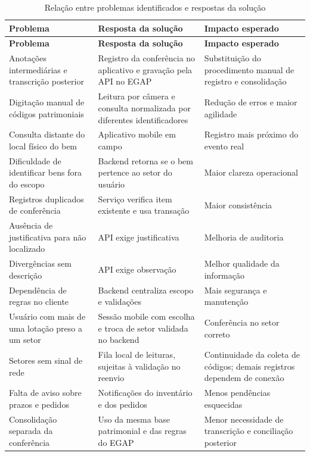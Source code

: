 \documentclass[12pt,a4paper]{article}
\begin{document}
\begin{longtable}{L{4.2cm}L{4.2cm}L{4.7cm}}
\caption{Relação entre problemas identificados e respostas da solução} \\
\toprule
\textbf{Problema} & \textbf{Resposta da solução} & \textbf{Impacto esperado} \\
\midrule
\endfirsthead
\toprule
\textbf{Problema} & \textbf{Resposta da solução} & \textbf{Impacto esperado} \\
\midrule
\endhead
Anotações intermediárias e transcrição posterior & Registro da conferência no aplicativo e gravação pela API no EGAP & Substituição do procedimento manual de registro e consolidação \\
Digitação manual de códigos patrimoniais & Leitura por câmera e consulta normalizada por diferentes identificadores & Redução de erros e maior agilidade \\
Consulta distante do local físico do bem & Aplicativo mobile em campo & Registro mais próximo do evento real \\
Dificuldade de identificar bens fora do escopo & Backend retorna se o bem pertence ao setor do usuário & Maior clareza operacional \\
Registros duplicados de conferência & Serviço verifica item existente e usa transação & Maior consistência \\
Ausência de justificativa para não localizado & API exige justificativa & Melhoria de auditoria \\
Divergências sem descrição & API exige observação & Melhor qualidade da informação \\
Dependência de regras no cliente & Backend centraliza escopo e validações & Mais segurança e manutenção \\
Usuário com mais de uma lotação preso a um setor & Sessão mobile com escolha e troca de setor validada no backend & Conferência no setor correto \\
Setores sem sinal de rede & Fila local de leituras, sujeitas à validação no reenvio & Continuidade da coleta de códigos; demais registros dependem de conexão \\
Falta de aviso sobre prazos e pedidos & Notificações do inventário e dos pedidos & Menos pendências esquecidas \\
Consolidação separada da conferência & Uso da mesma base patrimonial e das regras do EGAP & Menor necessidade de transcrição e conciliação posterior \\
\bottomrule
\end{longtable}
\end{document}

